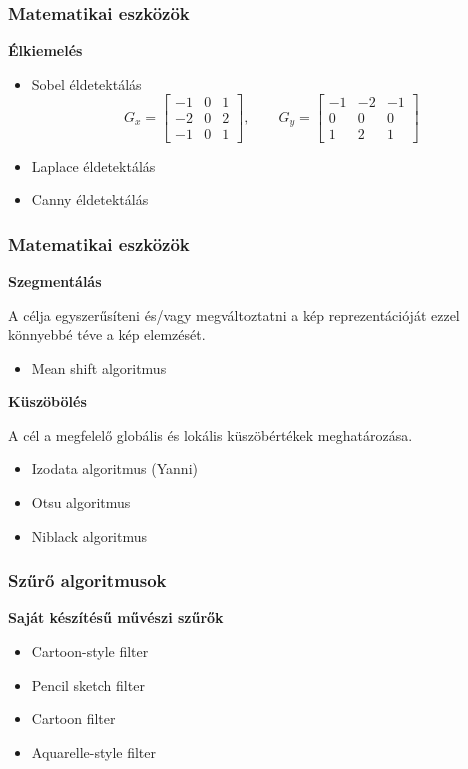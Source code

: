 \documentclass{beamer}
\begin{document}
\begin{frame}[fragile]
\frametitle{Matematikai eszközök}
\textbf{Élkiemelés}

\begin{itemize}
\item
Sobel éldetektálás
$$
G_x =
\begin{bmatrix}
-1&0  &1 \\ 
-2&0  &2 \\ 
-1&0  &1 
\end{bmatrix},
\qquad
G_y =
\begin{bmatrix}
-1&-2  &-1 \\ 
0&0  &0 \\ 
1&2  &1 
\end{bmatrix}
$$
\item Laplace éldetektálás
\item Canny éldetektálás
\end{itemize}

\end{frame}

\begin{frame}[fragile]
\frametitle{Matematikai eszközök}

\textbf{Szegmentálás}

A célja egyszerűsíteni és/vagy megváltoztatni a kép reprezentációját ezzel könnyebbé téve a kép elemzését.

\begin{itemize}
\item Mean shift algoritmus
\end{itemize}

\bigskip

\textbf{Küszöbölés}

A cél a megfelelő globális és lokális küszöbértékek meghatározása.

\begin{itemize}
\item Izodata algoritmus (Yanni)
\item Otsu algoritmus
\item Niblack algoritmus
\end{itemize}

\end{frame}

\begin{frame}[fragile]
\frametitle{Szűrő algoritmusok}

\textbf{Saját készítésű művészi szűrők}

\begin{itemize}
\item Cartoon-style filter
\item Pencil sketch filter
\item Cartoon filter
\item Aquarelle-style filter
\end{itemize}

\end{frame}
\end{document}
